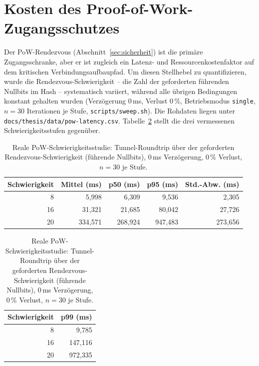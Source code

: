 \section{Kosten des Proof-of-Work-Zugangsschutzes}
\label{sec:eval-pow}

Der PoW-Rendezvous (Abschnitt~\ref{sec:sicherheit}) ist die primäre
Zugangsschranke, aber er ist zugleich ein Latenz- und Ressourcenkostenfaktor auf
dem kritischen Verbindungsaufbaupfad. Um diesen Stellhebel zu quantifizieren,
wurde die Rendezvous-Schwierigkeit -- die Zahl der geforderten führenden
Nullbits im Hash -- systematisch variiert, während alle übrigen Bedingungen
konstant gehalten wurden (Verzögerung 0\,ms, Verlust 0\,\%, Betriebsmodus
\texttt{single}, $n=30$ Iterationen je Stufe, \texttt{scripts/sweep.sh}). Die
Rohdaten liegen unter \texttt{docs/thesis/data/pow-latency.csv}.
Tabelle~\ref{tab:pow-latency} stellt die drei vermessenen Schwierigkeitsstufen
gegenüber.

\begin{table}[t]
  \centering
  \caption{Reale PoW-Schwierigkeitsstudie: Tunnel-Roundtrip über der geforderten
    Rendezvous-Schwierigkeit (führende Nullbits), 0\,ms Verzögerung, 0\,\%
    Verlust, $n=30$ je Stufe.}
  \label{tab:pow-latency}
  \begin{tabular}{rrrrr}
    \toprule
    Schwierigkeit & Mittel (ms) & p50 (ms) & p95 (ms) & Std.-Abw. (ms) \\
    \midrule
    8  & 5{,}998   & 6{,}309   & 9{,}536   & 2{,}305   \\
    16 & 31{,}321  & 21{,}685  & 80{,}042  & 27{,}726  \\
    20 & 334{,}571 & 268{,}924 & 947{,}483 & 273{,}656 \\
    \bottomrule
  \end{tabular}

  \medskip
  \begin{tabular}{rr}
    \toprule
    Schwierigkeit & p99 (ms) \\
    \midrule
    8  & 9{,}785   \\
    16 & 147{,}116 \\
    20 & 972{,}335 \\
    \bottomrule
  \end{tabular}
\end{table}

